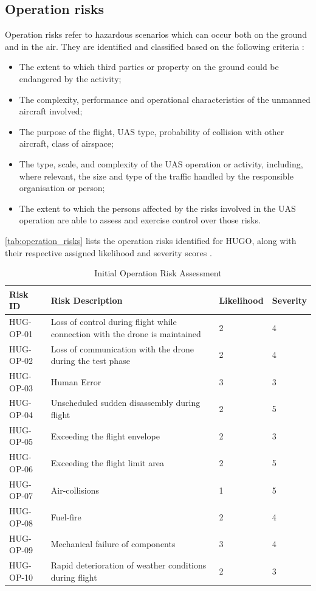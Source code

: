 \subsection{Operation risks}
Operation risks refer to hazardous scenarios which can occur both on the ground and in the air. They are identified and classified based on the following criteria \cite{Jarus_main}:
\begin{itemize}
    \item The extent to which third parties or property on the ground could be endangered by the activity;
    \item The complexity, performance and operational characteristics of the unmanned aircraft involved;
    \item The purpose of the flight, UAS type, probability of collision with other aircraft, class of airspace;
    \item The type, scale, and complexity of the UAS operation or activity, including, where relevant, the size and type of the traffic handled by the responsible organisation or person;
    \item The extent to which the persons affected by the risks involved in the UAS operation are able to assess and exercise control over those risks.
\end{itemize}

\autoref{tab:operation_risks} lists the operation risks identified for HUGO, along with their respective assigned likelihood and severity scores \cite{Wyszywacz2022}.

\begin{table}[H]
    \centering
    \caption{Initial Operation Risk Assessment}
    \begin{tabular}{|p{3cm}|p{8cm}|p{2cm}|p{1.5cm}|}
    \hline
       \textbf{Risk ID}  & \textbf{Risk Description} & \textbf{Likelihood} & \textbf{Severity} \\ \hline \hline
        HUG-OP-01 & Loss of control during flight while connection with the drone is maintained & 2 & 4 \\ \hline
        HUG-OP-02 & Loss of communication with the drone during the test phase & 2 & 4 \\ \hline
        HUG-OP-03 & Human Error & 3 & 3 \\ \hline
        HUG-OP-04 & Unscheduled sudden disassembly during flight & 2 & 5 \\ \hline
        HUG-OP-05 & Exceeding the flight envelope & 2 & 3 \\ \hline
        HUG-OP-06 & Exceeding the flight limit area & 2 & 5 \\ \hline
        HUG-OP-07 & Air-collisions & 1 & 5 \\ \hline
        HUG-OP-08 & Fuel-fire & 2 & 4 \\ \hline
        HUG-OP-09 & Mechanical failure of components & 3 & 4 \\ \hline
        HUG-OP-10 & Rapid deterioration of weather conditions during flight & 2 & 3 \\ \hline
    \end{tabular}
    \label{tab:operation_risks}
\end{table}

